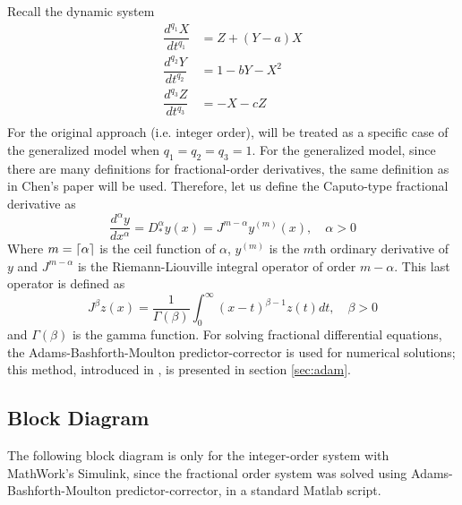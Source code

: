       Recall the dynamic system
      \begin{equation}
          \begin{array}{ll}
              \dfrac{d^{q_1}X}{dt^{q_1}}&=Z+(Y-a)X\\
              \dfrac{d^{q_2}Y}{dt^{q_2}}&=1-bY-X^2\\
              \dfrac{d^{q_3}Z}{dt^{q_3}}&=-X-cZ\\
          \end{array}
      \end{equation}
      For the original approach (i.e. integer order), will be treated as a specific case of the generalized model when  $q_1=q_2=q_3=1$. For the generalized model, since there are many definitions for fractional-order derivatives, the same definition as in Chen's paper will be used. Therefore, let us define the Caputo-type fractional derivative as 
      \begin{equation}
      	\dfrac{d^\alpha y}{dx^\alpha} = D_*^\alpha y(x) =  J^{m-\alpha}y^{(m)}(x), \quad \alpha > 0
      \end{equation}
      Where $m=\lceil\alpha\rceil$ is the ceil function of $\alpha$, $y^{(m)}$ is the $m$th ordinary derivative of $y$ and $J^{m-\alpha}$ is the Riemann-Liouville integral operator of order $m-\alpha$. This last operator is defined as
      \begin{equation}
      	J^\beta z(x) = \frac{1}{\Gamma (\beta)}\int_0^\infty{(x-t)^{\beta-1}z(t)dt}, \quad \beta > 0
      \end{equation}
      and $\Gamma(\beta)$ is the gamma function. For solving fractional differential equations, the Adams-Bashforth-Moulton predictor-corrector is used for numerical solutions; this method, introduced in \cite{diethelm2002predictor}, is presented in section \ref{sec:adam}.
      \subsection{Block Diagram}
      The following block diagram is only for the integer-order system with MathWork's Simulink, since the fractional order system was solved using Adams-Bashforth-Moulton predictor-corrector, in a standard Matlab script.
      
